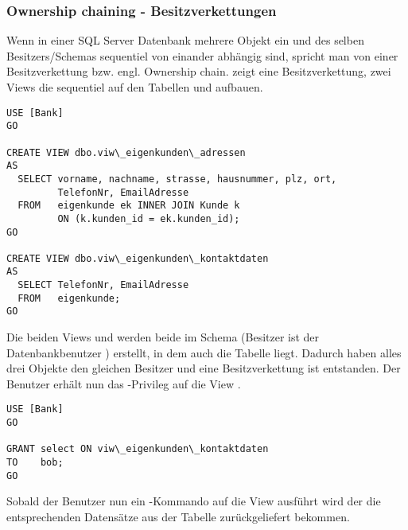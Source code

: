         \subsubsection{Ownership chaining - Besitzverkettungen}
          Wenn in einer SQL Server Datenbank mehrere Objekt ein und des selben
          Besitzers/Schemas sequentiel von einander abhängig sind, spricht man
          von einer Besitzverkettung bzw. engl. Ownership chain.
           zeigt eine Besitzverkettung, zwei Views die
          sequentiel auf den Tabellen  und
           aufbauen.
          \begin{lstlisting}[language=ms_sql,caption={Eine
          Besitzverkettung},label=sql19_12b]
USE [Bank]
GO

CREATE VIEW dbo.viw\_eigenkunden\_adressen
AS
  SELECT vorname, nachname, strasse, hausnummer, plz, ort,
         TelefonNr, EmailAdresse
  FROM   eigenkunde ek INNER JOIN Kunde k 
         ON (k.kunden_id = ek.kunden_id);
GO

CREATE VIEW dbo.viw\_eigenkunden\_kontaktdaten
AS
  SELECT TelefonNr, EmailAdresse
  FROM   eigenkunde;
GO
          \end{lstlisting}
          Die beiden Views  und
           werden beide im Schema
           (Besitzer ist der Datenbankbenutzer
          ) erstellt, in dem auch die Tabelle
           liegt. Dadurch haben alles drei Objekte den
          gleichen Besitzer und eine Besitzverkettung ist entstanden.
          Der Benutzer  erhält nun das
          -Privileg auf die View
          .
          \begin{lstlisting}[language=ms_sql,caption={Bob
          erhält Leserechte},label=sql19_12c]
USE [Bank]
GO

GRANT select ON viw\_eigenkunden\_kontaktdaten
TO    bob;
GO
          \end{lstlisting}
          Sobald der Benutzer  nun ein
          -Kommando auf die View
           ausführt wird der die
          entsprechenden Datensätze aus der Tabelle 
          zurückgeliefert bekommen.
          
